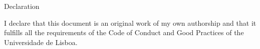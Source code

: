 
\begin{Declaration}
Declaration

I declare that this document is an original work of my own authorship and that it fulfills all the requirements of the Code of Conduct and Good Practices of the Universidade de Lisboa.
\end{Declaration}
